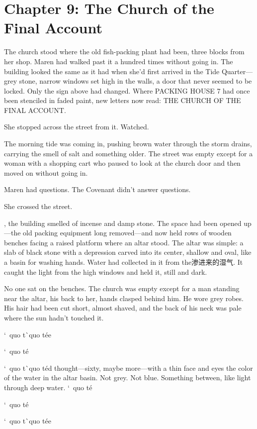 \documentclass[12pt,letterpaper,openany]{book}
\begin{document}
\chapter{Chapter 9: The Church of the Final Account}
The church stood where the old fish-packing plant had been, three blocks from her shop. Maren had walked past it a hundred times without going in. The building looked the same as it had when she'd first arrived in the Tide Quarter—grey stone, narrow windows set high in the walls, a door that never seemed to be locked. Only the sign above had changed. Where PACKING HOUSE 7 had once been stenciled in faded paint, new letters now read: THE CHURCH OF THE FINAL ACCOUNT.
\par
She stopped across the street from it. Watched.
\par
The morning tide was coming in, pushing brown water through the storm drains, carrying the smell of salt and something older. The street was empty except for a woman with a shopping cart who paused to look at the church door and then moved on without going in.
\par
Maren had questions. The Covenant didn't answer questions.
\par
She crossed the street.
\par
\hrulefillInside, the building smelled of incense and damp stone. The space had been opened up—the old packing equipment long removed—and now held rows of wooden benches facing a raised platform where an altar stood. The altar was simple: a slab of black stone with a depression carved into its center, shallow and oval, like a basin for washing hands. Water had collected in it from the渗进来的湿气. It caught the light from the high windows and held it, still and dark.
\par
No one sat on the benches. The church was empty except for a man standing near the altar, his back to her, hands clasped behind him. He wore grey robes. His hair had been cut short, almost shaved, and the back of his neck was pale where the sun hadn't touched it.
\par
`\ quo t\`\ quo t\'e{}e{}
\par
`\ quo t\'e{}
\par
`\ quo t\`\ quo t\'e{}d thought—sixty, maybe more—with a thin face and eyes the color of the water in the altar basin. Not grey. Not blue. Something between, like light through deep water. `\ quo t\'e{}
\par
`\ quo t\'e{}
\par
`\ quo t\`\ quo t\'e{}e{}
\par
\end{document}
